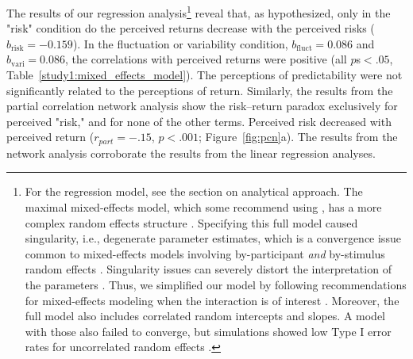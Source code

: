 \documentclass[a4paper,man, natbib,floatsintext]{apa6} %
\begin{document}
The results of our regression analysis\footnote{For the regression model, see the section on analytical approach. The maximal mixed-effects model, which some recommend using \citep{Barr2013a}, has a more complex random effects structure \citep[see][]{Judd2017}. Specifying this full model caused singularity, i.e., degenerate parameter estimates, which is a convergence issue common to mixed-effects models involving by-participant \textit{and} by-stimulus random effects \citep{Bates2015b}. Singularity issues can severely distort the interpretation of the parameters \citep{Bates2015b}. Thus, we simplified our model by following recommendations for mixed-effects modeling when the interaction is of interest \citep{Barr2013a}. Moreover, the full model also includes correlated random intercepts and slopes. A model with those also failed to converge, but simulations showed low Type I error rates for uncorrelated random effects \citep{Matuschek2017}.}
reveal that, as hypothesized, only in the "risk" condition do the perceived returns decrease with the perceived risks ($b_{\text{risk}}=-0.159$). In the fluctuation or variability condition, $b_{\text{fluct}}=0.086$ and $b_{\text{vari}}=0.086$, the correlations with perceived returns were positive (all $p$s$<.05$, Table~\ref{study1:mixed_effects_model}). The perceptions of predictability were not significantly related to the perceptions of return. Similarly, the results from the partial correlation network analysis show the risk--return paradox exclusively for perceived "risk," and for none of the other terms. Perceived risk decreased with perceived return ($r_{part} = -.15$, $p < .001$; Figure~\ref{fig:pcn}a).  The results from the network analysis corroborate the results from the linear regression analyses.


\end{document}
